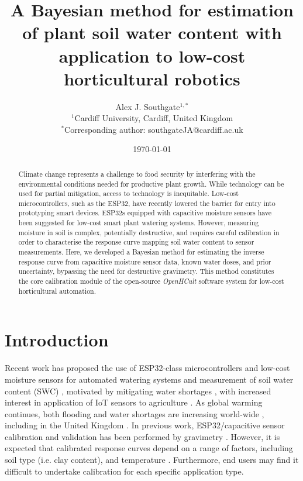\documentclass[11pt]{article}
\title{A Bayesian method for estimation of plant soil water content with application to low-cost horticultural robotics}
\author{
  Alex J. Southgate$^{1,*}$ \\[1em]
  \small $^{1}$Cardiff University, Cardiff, United Kingdom \\
  \small $^{*}$Corresponding author: southgateJA@cardiff.ac.uk
}
\date{\today}
\begin{document}
\maketitle

\begin{abstract}

Climate change represents a challenge to food security by interfering with the environmental conditions needed for productive plant growth. While technology can be used for partial mitigation, access to technology is inequitable. Low-cost microcontrollers, such as the ESP32, have recently lowered the barrier for entry into prototyping smart devices. ESP32s equipped with capacitive moisture sensors have been suggested for low-cost smart plant watering systems. However, measuring moisture in soil is complex, potentially destructive, and requires careful calibration in order to characterise the response curve mapping soil water content to sensor measurements. Here, we developed a Bayesian method for estimating the inverse response curve from capacitive moisture sensor data, known water doses, and prior uncertainty, bypassing the need for destructive gravimetry. This method constitutes the core calibration module of the open-source \textit{OpenHCult} software system for low-cost horticultural automation.

\end{abstract}

\section{Introduction}

Recent work has proposed the use of ESP32-class microcontrollers and low-cost moisture sensors for automated watering systems and measurement of soil water content (SWC) \cite{biswas2018-solar-pump, purnomo2021-lora, sudarmaji2024-smart-soil, afzal2025-arima}, motivated by mitigating water shortages \cite{afzal2025-arima}, with increased interest in application of IoT sensors to agriculture \cite{ruiz2025-iot-mapping}. As global warming continues, both flooding and water shortages are increasing world-wide \cite{ficklin2022hydrological}, including in the United Kingdom \cite{lane2021climate}. In previous work, ESP32/capacitive sensor calibration and validation has been performed by gravimetry \cite{sudarmaji2024-smart-soil}. However, it is expected that calibrated response curves depend on a range of factors, including soil type (i.e. clay content), and temperature \cite{merlin2007-calibration}. Furthermore, end users may find it difficult to undertake calibration for each specific application type. 
\end{document}
